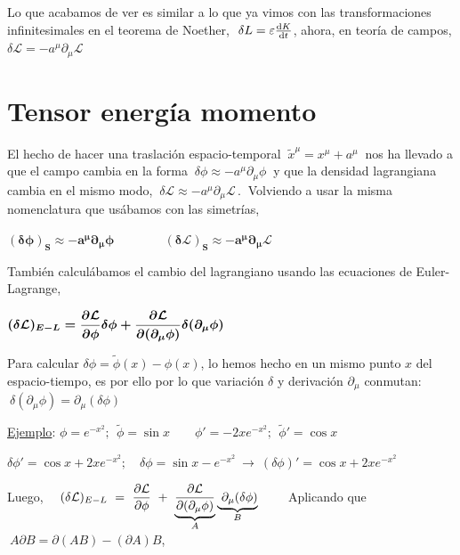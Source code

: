 \textcolor{gris}{Lo que acabamos de ver es similar a lo que ya vimos con las transformaciones infinitesimales en el teorema de Noether, $\ \delta  L=\varepsilon \dv{K}{t}$, ahora, en teoría de campos, $\displaystyle \delta \mathcal L=- a^\mu \partial_\mu \mathcal L$} 


\section{Tensor energía momento}

El hecho de hacer una traslación espacio-temporal $\ \tilde x^\mu=x^\mu+a^\mu\ $ nos ha llevado a que el campo cambia en la forma 
$\ \delta \phi \approx -a^\mu \partial_\mu \phi \ $ y que la densidad lagrangiana cambia en el mismo modo,
$\ \delta \mathcal L\approx -a^\mu \partial_\mu \mathcal L\, . \ $ Volviendo a usar la misma nomenclatura que usábamos con las simetrías,

\hspace{2cm} $\boldsymbol{ (\delta \phi)_S \approx -a^\mu \partial_\mu \phi \qquad  \qquad (\delta \mathcal L)_S \approx -a^\mu \partial_\mu \mathcal L}$

También calculábamos el cambio del lagrangiano usando las ecuaciones de Euler-Lagrange, 

\hspace{2cm}$\displaystyle \boldsymbol{ (\delta \mathcal L)_{E-L} = \pdv{\mathcal L}{\phi} \delta \phi + \pdv{\mathcal L}{(\partial_\mu \phi)} \delta(\partial_\mu \phi)}$

Para calcular $\delta \phi=\tilde \phi(x)-\phi(x)$, lo hemos hecho en un mismo punto $x$ del espacio-tiempo, es por ello por lo que variación $\delta$ y derivación $\partial_\mu$  conmutan: $\ \delta(\partial_\mu \phi) = \partial_\mu(\delta \phi)$

\hspace{1cm} \textcolor{gris}{\underline {Ejemplo}: $\phi=e^{-x^2};\ \ \tilde \phi=\sin x \qquad \phi'=-2xe^{-x^2} ; \ \ \tilde \phi'=\cos x$}

\hspace{1cm} \textcolor{gris}{$\delta \phi'=\cos x + 2x e^{-x^2} ;\quad \delta \phi=\sin x - e^{-x^2} \ \to \ (\delta \phi)'= \cos x + 2xe^{-x^2}$}

Luego, $\quad \displaystyle (\delta \mathcal L)_{E-L} \ = \ \pdv{\mathcal L}{\phi} \ + \ \underbrace{ \pdv{\mathcal L}{(\partial_\mu \phi)} }_{A}  \underbrace{ \ \partial_\mu (\delta \phi) }_{B} \qquad $
Aplicando que $\ A\partial B=\partial(AB)-(\partial A)B$,

